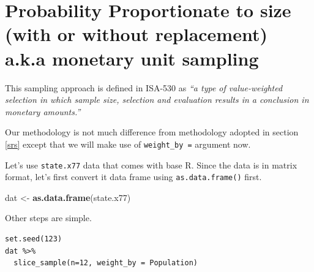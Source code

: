 \documentclass[
]{book}
\newenvironment{Shaded}{\begin{snugshade}}{\end{snugshade}}
\newcommand{\FunctionTok}[1]{\textcolor[rgb]{0.13,0.29,0.53}{\textbf{#1}}}
\newcommand{\NormalTok}[1]{#1}
\newcommand{\OtherTok}[1]{\textcolor[rgb]{0.56,0.35,0.01}{#1}}
\begin{document}
\hypertarget{probability-proportionate-to-size-with-or-without-replacement-a.k.a-monetary-unit-sampling}{%
\section{Probability Proportionate to size (with or without replacement) a.k.a monetary unit sampling}\label{probability-proportionate-to-size-with-or-without-replacement-a.k.a-monetary-unit-sampling}}

This sampling approach is defined in ISA-530 as \emph{``a type of value-weighted selection in which sample size, selection and evaluation results in a conclusion in monetary amounts.''}

Our methodology is not much difference from methodology adopted in section \ref{srs} except that we will make use of \texttt{weight\_by\ =} argument now.

Let's use \texttt{state.x77} data that comes with base R. Since the data is in matrix format, let's first convert it data frame using \texttt{as.data.frame()} first.

\begin{Shaded}
\begin{Highlighting}[]
\NormalTok{dat }\OtherTok{\textless{}{-}} \FunctionTok{as.data.frame}\NormalTok{(state.x77)}
\end{Highlighting}
\end{Shaded}

Other steps are simple.

\begin{verbatim}
set.seed(123)
dat %>% 
  slice_sample(n=12, weight_by = Population)
\end{verbatim}
\end{document}
